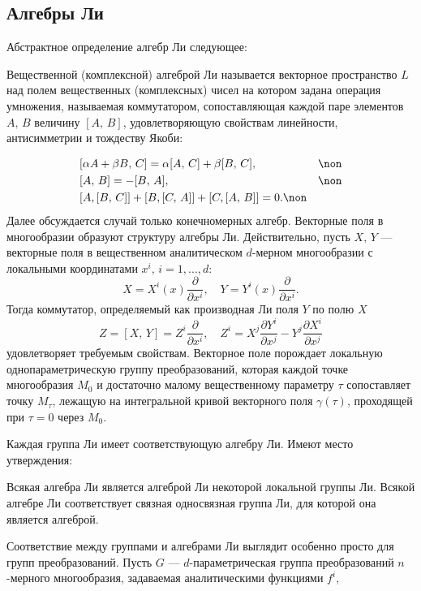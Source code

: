 \documentclass[a4paper
]{article}
\begin{document}
\subsection{Алгебры Ли}
Абстрактное определение алгебр Ли следующее:
\begin{Def}
Вещественной (комплексной) алгеброй Ли  называется векторное
пространство $L$ над полем вещественных (комплексных) чисел на
котором задана операция умножения, называемая коммутатором,
сопоставляющая каждой паре элементов $A,\, B$ величину $[A,\,B]$,
удовлетворяющую свойствам линейности, антисимметрии и тождеству
Якоби: \end{Def}\vspace{-5mm}
\begin{eqnarray}
     & [\alpha A+\beta B,\,C]=\alpha[A,\,C]+\beta[B,\,C],&  \non \\
     &[A,\,B]=-[B,\,A],&  \non \\
     &[A,[B,\,C]]+[B,[C,\,A]]+[C,[A,\,B]]=0.\non&
 \end{eqnarray}
Далее обсуждается случай только конечномерных алгебр. Векторные
поля в многообразии образуют структуру алгебры Ли. Действительно,
пусть $X,\, Y$ --- векторные поля в вещественном аналитическом
$d$-мерном многообразии с локальными координатами $x^i,\,
i=1,...,d$:
$$ X=X^i(x)\frac{\partial}{\partial x^i},\quad
Y=Y^i(x)\frac{\partial}{\partial x^i}.$$ Тогда коммутатор,
определяемый как производная Ли поля $Y$ по полю $X$
$$Z=[X,\,Y]=Z^i \frac{\partial}{\partial x^i},\quad Z^i=X^j
\frac{\partial Y^i}{\partial x^j}-Y^j \frac{\partial X^i}{\partial
x^j}$$ удовлетворяет требуемым свойствам.   Векторное поле
порождает локальную однопараметрическую группу преобразований,
которая каждой точке многообразия $M_0$ и достаточно малому
вещественному параметру $\tau$  сопоставляет точку $M_\tau$,
лежащую на интегральной кривой векторного поля $\gamma(\tau)$,
проходящей при $\tau=0$ через  $M_0$.
\par
Каждая группа Ли имеет соответствующую алгебру Ли. Имеют место
утверждения:
\begin{Trm} Всякая алгебра Ли является алгеброй Ли некоторой
локальной группы Ли. Всякой алгебре Ли соответствует связная
односвязная группа Ли, для которой она является алгеброй.
\end{Trm} Соответствие между группами и алгебрами Ли выглядит
особенно просто для групп преобразований. Пусть $G$
--- $d$-параметрическая группа преобразований  $n$ -мерного
многообразия, задаваемая аналитическими функциями $f^i$,
\end{document}
